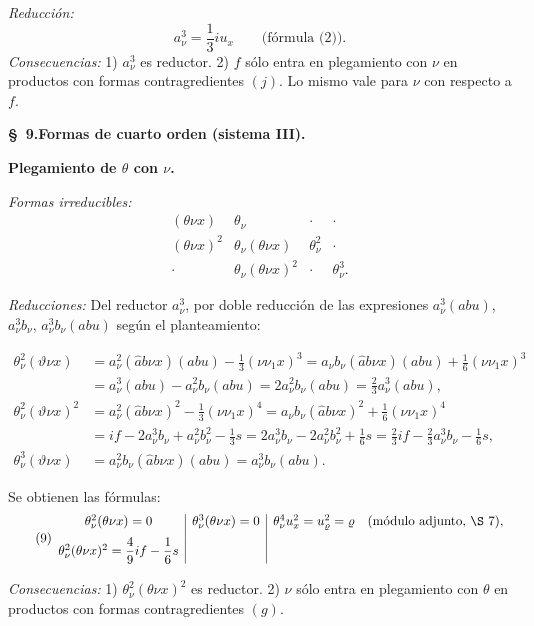 \documentclass[11pt]{article}
\begin{document}
\noindent\emph{Reducción:}
\[
a_\nu^3=\frac13 i u_x\qquad\text{(fórmula (2)).}
\]
\noindent\emph{Consecuencias:} 1) $a_\nu^3$ es reductor. 2) $f$ sólo entra en plegamiento con $\nu$ en productos con formas contragredientes $(j)$. Lo mismo vale para $\nu$ con respecto a $f$.

\begin{center}
\textbf{\S\ 9.\quad Formas de cuarto orden (sistema III).}
\end{center}

\noindent\textbf{Plegamiento de $\theta$ con $\nu$.}

\noindent\emph{Formas irreducibles:}
\[
\begin{array}{cccc}
(\theta\nu x)&\theta_\nu&\cdot&\cdot\\
(\theta\nu x)^2&\theta_\nu(\theta\nu x)&\theta_\nu^2&\cdot\\
\cdot&\theta_\nu(\theta\nu x)^2&\cdot&\theta_\nu^3.
\end{array}
\]

\noindent\emph{Reducciones:} Del reductor $a_\nu^3$, por doble reducción de las expresiones $a_\nu^3(abu)$, $a_\nu^3b_\nu$, $a_\nu^3b_\nu(abu)$ según el planteamiento:

\[
\begin{aligned}
\theta_\nu^2(\vartheta\nu x)
&=a_\nu^2(\widehat{a}b\nu x)(abu)-\frac13(\nu\nu_1x)^3=a_\nu b_\nu(\widehat{a}b\nu x)(abu)+\frac16(\nu\nu_1x)^3\\
&=a_\nu^3(abu)-a_\nu^2b_\nu(abu)=2a_\nu^2b_\nu(abu)=\frac23a_\nu^3(abu),\\[.4em]
\theta_\nu^2(\vartheta\nu x)^2
&=a_\nu^2(\widehat{a}b\nu x)^2-\frac13(\nu\nu_1x)^4=a_\nu b_\nu(\widehat{a}b\nu x)^2+\frac16(\nu\nu_1x)^4\\
&=if-2a_\nu^3b_\nu+a_\nu^2b_\nu^2-\frac13s=2a_\nu^3b_\nu-2a_\nu^2b_\nu^2+\frac16s=\frac23if-\frac23a_\nu^3b_\nu-\frac16s,\\[.4em]
\theta_\nu^3(\vartheta\nu x)&=a_\nu^2b_\nu(\widehat{a}b\nu x)(abu)=a_\nu^3b_\nu(abu).
\end{aligned}
\]

Se obtienen las fórmulas:
\[
\tag{9}
\begin{array}{c|c|c}
\theta_\nu^2(\theta\nu x)=0
& \theta_\nu^3(\theta\nu x)=0
& \theta_\nu^4u_x^2=u_\varrho^2=\varrho\quad(\text{módulo adjunto, \S\ 7}),\\[0.6em]
\theta_\nu^2(\theta\nu x)^2=\dfrac49 i f-\dfrac16s
& &
\end{array}
\]

\noindent\emph{Consecuencias:} 1) $\theta_\nu^2(\theta\nu x)^2$ es reductor. 2) $\nu$ sólo entra en plegamiento con $\theta$ en productos con formas contragredientes $(g)$.
\end{document}
